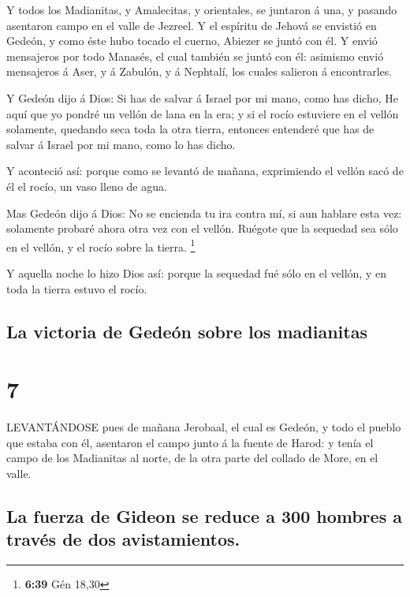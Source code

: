  Y todos los Madianitas, y Amalecitas, y orientales, se
juntaron á una, y pasando asentaron campo en el valle de Jezreel.
 Y el espíritu de Jehová se envistió en Gedeón, y como éste
hubo tocado el cuerno, Abiezer se juntó con él.  Y envió
mensajeros por todo Manasés, el cual también se juntó con él: asimismo
envió mensajeros á Aser, y á Zabulón, y á Nephtalí, los cuales salieron
á encontrarles.

 Y Gedeón dijo á Dios: Si has de salvar á Israel por mi
mano, como has dicho,  He aquí que yo pondré un vellón de
lana en la era; y si el rocío estuviere en el vellón solamente, quedando
seca toda la otra tierra, entonces entenderé que has de salvar á Israel
por mi mano, como lo has dicho.

 Y aconteció así: porque como se levantó de mañana,
exprimiendo el vellón sacó de él el rocío, un vaso lleno de agua.

 Mas Gedeón dijo á Dios: No se encienda tu ira contra mí,
si aun hablare esta vez: solamente probaré ahora otra vez con el vellón.
Ruégote que la sequedad sea sólo en el vellón, y el rocío sobre la
tierra. \footnote{\textbf{6:39} Gén 18,30}

 Y aquella noche lo hizo Dios así: porque la sequedad fué
sólo en el vellón, y en toda la tierra estuvo el rocío.

\hypertarget{la-victoria-de-gedeuxf3n-sobre-los-madianitas}{%
\subsection{La victoria de Gedeón sobre los
madianitas}\label{la-victoria-de-gedeuxf3n-sobre-los-madianitas}}

\hypertarget{section-6}{%
\section{7}\label{section-6}}

 LEVANTÁNDOSE pues de mañana Jerobaal, el cual es Gedeón, y
todo el pueblo que estaba con él, asentaron el campo junto á la fuente
de Harod: y tenía el campo de los Madianitas al norte, de la otra parte
del collado de More, en el valle.

\hypertarget{la-fuerza-de-gideon-se-reduce-a-300-hombres-a-travuxe9s-de-dos-avistamientos.}{%
\subsection{La fuerza de Gideon se reduce a 300 hombres a través de dos
avistamientos.}\label{la-fuerza-de-gideon-se-reduce-a-300-hombres-a-travuxe9s-de-dos-avistamientos.}}

